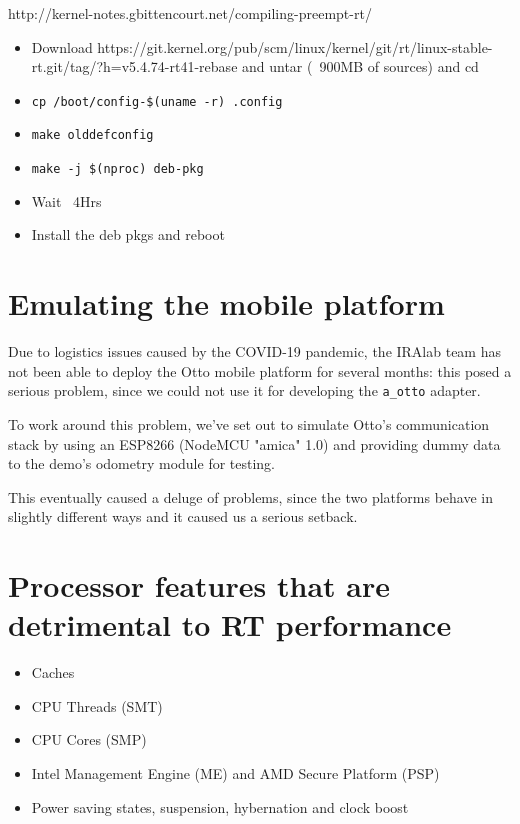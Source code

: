 \documentclass[a4paper,12pt]{report}
\begin{document}
http://kernel-notes.gbittencourt.net/compiling-preempt-rt/

\begin{itemize}
    \item Download https://git.kernel.org/pub/scm/linux/kernel/git/rt/linux-stable-rt.git/tag/?h=v5.4.74-rt41-rebase and untar (~900MB of sources) and cd
    \item \texttt{cp /boot/config-\$(uname -r) .config}
    \item \texttt{make olddefconfig}
    \item \texttt{make -j \$(nproc) deb-pkg}
    \item Wait ~4Hrs
    \item Install the deb pkgs and reboot
\end{itemize}

\section{Emulating the mobile platform}

Due to logistics issues caused by the COVID-19 pandemic, the IRAlab team has not been able to deploy the Otto mobile platform for several months: this posed a serious problem, since we could not use it for developing the \texttt{a\_otto} adapter.

To work around this problem, we've set out to simulate Otto's communication stack by using an ESP8266 (NodeMCU "amica" 1.0) and providing dummy data to the demo's odometry module for testing. 

This eventually caused a deluge of problems, since the two platforms behave in slightly different ways and it caused us a serious setback.


\section{Processor features that are detrimental to RT performance}

\begin{itemize}
    \item Caches
    \item CPU Threads (SMT)
    \item CPU Cores (SMP)
    \item Intel Management Engine (ME) and AMD Secure Platform (PSP)
    \item Power saving states, suspension, hybernation and clock boost
\end{itemize}
\end{document}
